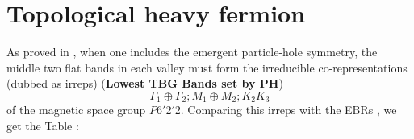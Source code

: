 %
%


\chapter{Topological heavy fermion}


As proved in \cite{all_magic_angles}, when one includes the emergent particle-hole symmetry, the middle two flat bands in each valley must form the irreducible co-representations (dubbed as irreps) (\textbf{Lowest TBG Bands set by PH})
\begin{equation} \label{eq:matbg-irreps}
\Gamma_1 \oplus \Gamma_2; M_1 \oplus M_2; K_2 K_3
\end{equation}
of the magnetic space group $P6'2'2$. Comparing this irreps with the EBRs \cite{topological_quantum_chemistry}, we get the Table \cite{tab:matbg-irreps}:


